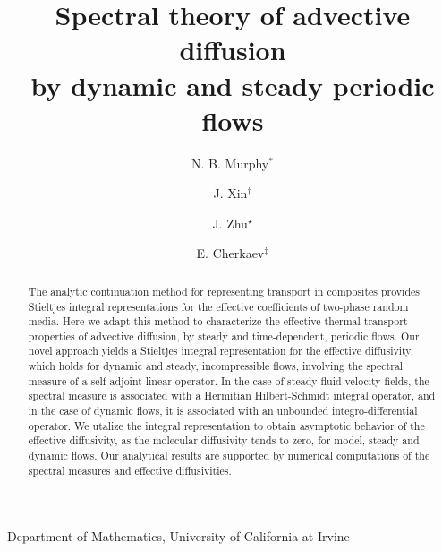 \documentclass[11pt]{amsart}
\begin{document}
\title{Spectral theory of advective diffusion \\
  by dynamic and steady periodic flows}


\author{N. B. Murphy$^\ast$}
\address{$^*$Department of Mathematics, 340 Rowland Hall, University of
  California at Irvine, Irvine, CA 92697-3875, USA}

\author{J. Xin$^\dag$}
\address{$^{\dag}$Department of Mathematics, 340 Rowland Hall, University of
  California at Irvine, Irvine, CA 92697-3875, USA} 

\author{J. Zhu$^\star$}
\address{$^\star$University of Utah, Department of Mathematics, 155 S 1400 E
  RM 233, Salt Lake City, UT 84112-009, USA}

\author{E. Cherkaev$^\ddagger$}
\address{$^\ddagger$University of Utah, Department of Mathematics, 155 S 1400 E
  RM 233, Salt Lake City, UT 84112-009, USA} 

\maketitle
\vspace{-3ex}
\begin{center}
  Department of Mathematics, University of California at Irvine
\end{center}



\begin{abstract}
%
The analytic continuation method for representing transport in
composites provides Stieltjes integral representations for the
effective coefficients of two-phase random media. Here we adapt this 
method to characterize the effective thermal transport properties of
advective diffusion, by steady and time-dependent, periodic flows. Our
novel approach yields a Stieltjes integral representation for the
effective diffusivity, which holds for dynamic and steady,
incompressible flows, involving the spectral measure of a self-adjoint
linear operator. In the case of steady fluid velocity fields, the
spectral measure is associated with a Hermitian Hilbert-Schmidt
integral operator, and in the case of dynamic flows, it is associated
with an unbounded integro-differential operator. We utalize the
integral representation to obtain asymptotic behavior of the effective 
diffusivity, as the molecular diffusivity tends to zero, for model,
steady and dynamic flows. Our analytical results are supported by
numerical computations of the spectral measures and effective
diffusivities.    
%
\end{abstract}
\end{document}
